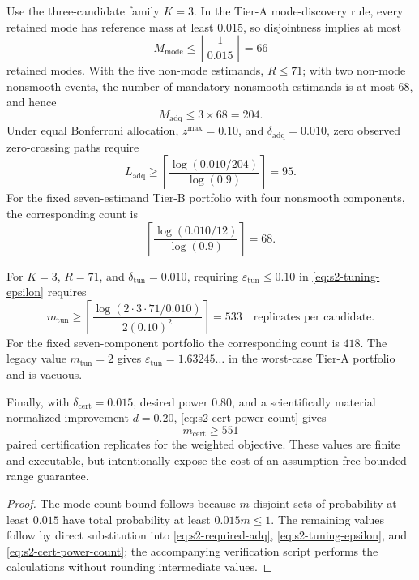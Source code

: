 \begin{proposition}
\label{prop:s2-tier-a}
Use the three-candidate family \(K=3\).  In the Tier-A mode-discovery rule,
every retained mode has reference mass at least \(0.015\), so disjointness
implies at most
\[
 M_{\mathrm{mode}}
 \leq\left\lfloor\frac1{0.015}\right\rfloor=66
\]
retained modes.  With the five non-mode estimands, \(R\leq71\); with two
non-mode nonsmooth events, the number of mandatory nonsmooth estimands is at
most \(68\), and hence
\[
 M_{\mathrm{adq}}\leq3\times68=204.
\]
Under equal Bonferroni allocation, \(z^{\max}=0.10\), and
\(\delta_{\mathrm{adq}}=0.010\), zero observed zero-crossing paths require
\begin{equation}
 L_{\mathrm{adq}}
 \geq
 \left\lceil
 \frac{\log(0.010/204)}{\log(0.9)}
 \right\rceil
 =
 95.
 \label{eq:s2-tier-a-adq}
\end{equation}
For the fixed seven-estimand Tier-B portfolio with four nonsmooth components,
the corresponding count is
\[
 \left\lceil
 \frac{\log(0.010/12)}{\log(0.9)}
 \right\rceil
 =
 68.
\]

For \(K=3\), \(R=71\), and \(\delta_{\mathrm{tun}}=0.010\), requiring
\(\varepsilon_{\mathrm{tun}}\leq0.10\) in
\eqref{eq:s2-tuning-epsilon} requires
\begin{equation}
 m_{\mathrm{tun}}
 \geq
 \left\lceil
  \frac{\log(2\cdot3\cdot71/0.010)}
       {2(0.10)^2}
 \right\rceil
 =
 533
 \quad\text{replicates per candidate}.
 \label{eq:s2-tier-a-tuning}
\end{equation}
For the fixed seven-component portfolio the corresponding count is \(418\).
The legacy value \(m_{\mathrm{tun}}=2\) gives
\(\varepsilon_{\mathrm{tun}}=1.63245\ldots\) in the worst-case Tier-A
portfolio and is vacuous.

Finally, with \(\delta_{\mathrm{cert}}=0.015\), desired power \(0.80\), and a
scientifically material normalized improvement \(d=0.20\),
\eqref{eq:s2-cert-power-count} gives
\begin{equation}
 m_{\mathrm{cert}}\geq551
 \label{eq:s2-tier-a-cert}
\end{equation}
paired certification replicates for the weighted objective.  These values are
finite and executable, but intentionally expose the cost of an assumption-free
bounded-range guarantee.
\end{proposition}

\begin{proof}
The mode-count bound follows because \(m\) disjoint sets of probability at
least \(0.015\) have total probability at least \(0.015m\leq1\).  The remaining
values follow by direct substitution into
\eqref{eq:s2-required-adq}, \eqref{eq:s2-tuning-epsilon}, and
\eqref{eq:s2-cert-power-count}; the accompanying verification script performs
the calculations without rounding intermediate values.
\end{proof}

